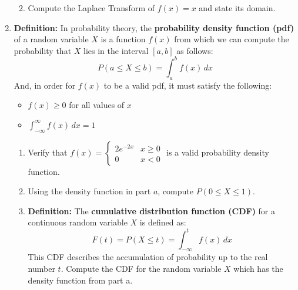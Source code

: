 \documentclass[12pt]{article}
\newif\ifans
\begin{document}
\begin{enumerate}
\begin{enumerate}
\ifans{\fbox{$\mathcal{L}\left\{e^x\right\}(s)=\frac{1}{1-s}$ for $s >1$}} \fi

\item Compute the Laplace Transform of $f(x)=x$ and state its domain.

\ifans{\fbox{$\mathcal{L}\left\{x\right\}(s)=\frac{1}{s^2}$ for $s >0$}} \fi

\end{enumerate}

\item {\bf Definition:} In probability theory, the {\bf probability density function (pdf)} of a random variable $X$ is a function $f(x)$ from which we can compute the probability that $X$ lies in the interval $[a,b]$ as follows: $$P(a\leq X \leq b)=\int_a^b f(x) \,dx$$  And, in order for $f(x)$ to be a valid pdf, it must satisfy the following:

\begin{itemize}

\item $f(x) \geq 0$ for all values of $x$

\item $\int_{-\infty}^{\infty} f(x) \,dx=1$

\end{itemize}

\begin{enumerate}

\item Verify that $f(x)=\left\{\begin{array}{ll}
2e^{-2x} & x \geq 0\\
0 & x <0
\end{array}\right.$ is a valid probability density function.

\ifans{\fbox{\parbox{1\linewidth}{Notice that $f(x) > 0$ for all $x$ because $e^{-2x}>0$ for all $x$.  And, $$\int_{-\infty}^{\infty}f(x) \,dx=\int_0^{\infty}2e^{-2x} \,dx =1$$  Thus, $f(x)$ is a valid pdf.}}} \fi

\item Using the density function in part $a$, compute $P(0 \leq X \leq 1)$.

\ifans{\fbox{$\int_0^{1}2e^{-2x} \,dx=1-\frac{1}{e^2}$}} \fi

\item {\bf Definition:} The {\bf cumulative distribution function (CDF)} for a continuous random variable $X$ is defined as: $$F(t)=P(X \leq t)=\int_{-\infty}^t f(x) \,dx$$  This CDF describes the accumulation of probability up to the real number $t$.  Compute the CDF for the random variable $X$ which has the density function from part a.

\ifans{\fbox{The CDF is $F(t)=\int_{-\infty}^{t}f(x) \,dx=\int_{0}^{t}2e^{-2x} \,dx=1-e^{-2t}$ for $t \geq 0$ and 0 for $t<0$.}} \fi

\end{enumerate}

\end{enumerate}
\end{document}
